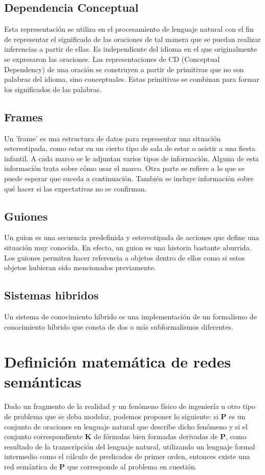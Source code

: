 \documentclass[11pt]{article}
\begin{document}
\subsection{Dependencia Conceptual}
\label{sec:org55ce958}
\autocite{Raghavavaiah} Esta representación se utiliza en el
procesamiento de lenguaje natural con el fin de representar el
significado de las oraciones de tal manera que se puedan realizar
inferencias a partir de ellas. Es independiente del idioma en el que
originalmente se expresaron las oraciones. Las representaciones de CD
(Conceptual Dependency) de una oración se construyen a partir de
primitivas que no son palabras del idioma, sino conceptuales. Estas
primitivas se combinan para formar los significados de las palabras. 

\subsection{Frames}
\label{sec:org6fd7fab}
\autocite{Minsky_1974} Un 'frame' es una estructura de datos para
representar una situación estereotipada, como estar en un cierto tipo
de sala de estar o asistir a una fiesta infantil. A cada marco se le
adjuntan varios tipos de información. Alguna de esta información trata
sobre cómo usar el marco. Otra parte se refiere a lo que se puede
esperar que suceda a continuación. También se incluye información
sobre qué hacer si las expectativas no se confirman. 

\subsection{Guiones}
\label{sec:orgffe7140}
\autocite{Schank1975ScriptsPA} Un guion es una secuencia
predefinida y estereotipada de acciones que define una situación muy
conocida. En efecto, un guion es una historia bastante aburrida. Los
guiones permiten hacer referencia a objetos dentro de ellos como si
estos objetos hubieran sido mencionados previamente. 

\subsection{Sistemas hibridos}
\label{sec:orgdd80c06}
\autocite{prasad2012hybrid} Un sistema de conocimiento híbrido es
una implementación de un formalismo de conocimiento híbrido que consta
de dos o más subformalismos diferentes. 


\section{Definición matemática de redes semánticas}
\label{sec:orgab8d76a}
\autocite{Hernandez_Karelin_Tarasenko_2014} Dado un fragmento de
la realidad y un fenómeno físico de ingeniería u otro tipo de problema
que se deba modelar, podemos proponer lo siguiente: si \textbf{P} es un
conjunto de oraciones en lenguaje natural que describe dicho fenómeno
y si el conjunto correspondiente \textbf{K} de fórmulas bien formadas derivadas
de \textbf{P}, como resultado de la transcripción del lenguaje natural,
utilizando un lenguaje formal intermedio como el cálculo de predicados
de primer orden, entonces existe una red semántica de \textbf{P} que
corresponde al problema en cuestión.  
\end{document}
